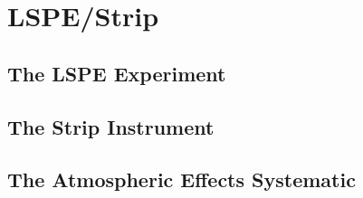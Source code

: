 \chapter{LSPE/Strip}

\section{The LSPE Experiment}

\section{The Strip Instrument}

\section{The Atmospheric Effects Systematic}
